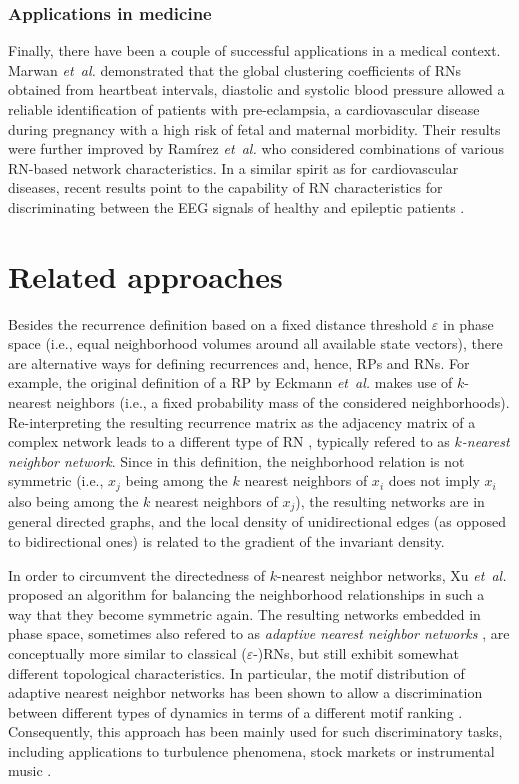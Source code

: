\documentclass[graybox]{svmult}
\begin{document}
\subsubsection{Applications in medicine}

Finally, there have been a couple of successful applications in a medical context. Marwan \textit{et~al.} \cite{Marwan2010Biosignal} demonstrated that the global clustering coefficients of RNs obtained from heartbeat intervals, diastolic and systolic blood pressure allowed a reliable identification of patients with pre-eclampsia, a cardiovascular disease during pregnancy with a high risk of fetal and maternal morbidity. Their results were further improved by Ram\'{i}rez \textit{et~al.} \cite{Ramirez2012,Ramirez2013} who considered combinations of various RN-based network characteristics. In a similar spirit as for cardiovascular diseases, recent results point to the capability of RN characteristics for discriminating between the EEG signals of healthy and epileptic patients \cite{Subramaniyam2013}.


\section{Related approaches}

Besides the recurrence definition based on a fixed distance threshold $\varepsilon$ in phase space (i.e., equal neighborhood volumes around all available state vectors), there are alternative ways for defining recurrences and, hence, RPs and RNs. For example, the original definition of a RP by Eckmann \textit{et~al.} \cite{Eckmann1987} makes use of $k$-nearest neighbors (i.e., a fixed probability mass of the considered neighborhoods). Re-interpreting the resulting recurrence matrix as the adjacency matrix of a complex network leads to a different type of RN \cite{Shimada2008}, typically refered to as \emph{$k$-nearest neighbor network}. Since in this definition, the neighborhood relation is not symmetric (i.e., $x_j$ being among the $k$ nearest neighbors of $x_i$ does not imply $x_i$ also being among the $k$ nearest neighbors of $x_j$), the resulting networks are in general directed graphs, and the local density of unidirectional edges (as opposed to bidirectional ones) is related to the gradient of the invariant density.

In order to circumvent the directedness of $k$-nearest neighbor networks, Xu \textit{et~al.} \cite{Small2009,Xu2008} proposed an algorithm for balancing the neighborhood relationships in such a way that they become symmetric again. The resulting networks embedded in phase space, sometimes also refered to as \emph{adaptive nearest neighbor networks} \cite{Donner2011IJBC}, are conceptually more similar to classical ($\varepsilon$-)RNs, but still exhibit somewhat different topological characteristics. In particular, the motif distribution of adaptive nearest neighbor networks has been shown to allow a discrimination between different types of dynamics in terms of a different motif ranking \cite{Liu2010,Xu2008}. Consequently, this approach has been mainly used for such discriminatory tasks, including applications to turbulence phenomena, stock markets \cite{Liu2010} or instrumental music \cite{Donner2011IJBC}.
\end{document}
